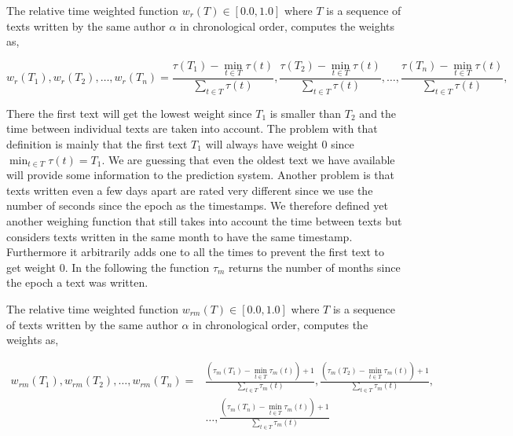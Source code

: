 \begin{definition}

    The relative time weighted function $w_r(T) \in [0.0, 1.0]$ where $T$ is a
    sequence of texts written by the same author $\alpha$ in chronological
    order, computes the weights as,

    \begin{equation}
        w_r(T_1), w_r(T_2), \dots, w_r(T_n) =
            \frac{\tau(T_1) - \min_{t \in T} \tau(t)}{\sum_{t \in T} \tau(t)},
            \frac{\tau(T_2) - \min_{t \in T} \tau(t)}{\sum_{t \in T} \tau(t)},
            \dots,
            \frac{\tau(T_n) - \min_{t \in T} \tau(t)}{\sum_{t \in T} \tau(t)},
    \end{equation}

\end{definition}

There the first text will get the lowest weight since $T_1$ is smaller than
$T_2$ and the time between individual texts are taken into account. The problem
with that definition is mainly that the first text $T_1$ will always have weight
0 since $\min_{t \in T} \tau(t) = T_1$. We are guessing that even the oldest
text we have available will provide some information to the prediction system.
Another problem is that texts written even a few days apart are rated very
different since we use the number of seconds since the epoch as the timestamps.
We therefore defined yet another weighing function that still takes into account
the time between texts but considers texts written in the same month to have the
same timestamp. Furthermore it arbitrarily adds one to all the times to prevent
the first text to get weight 0. In the following the function $\tau_m$ returns
the number of months since the epoch a text was written.

\begin{definition}

    The relative time weighted function $w_{rm}(T) \in [0.0, 1.0]$ where $T$ is
    a sequence of texts written by the same author $\alpha$ in chronological
    order, computes the weights as,

    \begin{align}
        w_{rm}(T_1), w_{rm}(T_2), \dots, w_{rm}(T_n) =&
            \frac{(\tau_m(T_1) - \min_{t \in T} \tau_m(t)) + 1}{\sum_{t \in T} \tau_m(t)},
            \frac{(\tau_m(T_2) - \min_{t \in T} \tau_m(t)) + 1}{\sum_{t \in T} \tau_m(t)}, \\
            & \dots,
            \frac{(\tau_m(T_n) - \min_{t \in T} \tau_m(t)) + 1}{\sum_{t \in T} \tau_m(t)}
    \end{align}

\end{definition}

